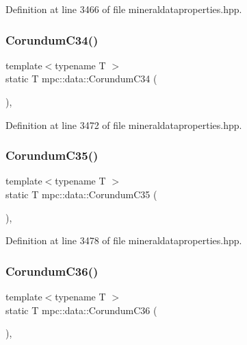 Definition at line 3466 of file mineraldataproperties.\+hpp.

\mbox{\label{namespacempc_1_1data_a0c5d889d0235384d47297eed4aefdea1}} 
\subsubsection{\texorpdfstring{Corundum\+C34()}{CorundumC34()}}
{\footnotesize\ttfamily template$<$typename T $>$ \\
static T mpc\+::data\+::\+Corundum\+C34 (\begin{DoxyParamCaption}{ }\end{DoxyParamCaption})\hspace{0.3cm}{\ttfamily [inline]}, {\ttfamily [static]}}



Definition at line 3472 of file mineraldataproperties.\+hpp.

\mbox{\label{namespacempc_1_1data_a65507f6191b27515bbcb02f456254042}} 
\subsubsection{\texorpdfstring{Corundum\+C35()}{CorundumC35()}}
{\footnotesize\ttfamily template$<$typename T $>$ \\
static T mpc\+::data\+::\+Corundum\+C35 (\begin{DoxyParamCaption}{ }\end{DoxyParamCaption})\hspace{0.3cm}{\ttfamily [inline]}, {\ttfamily [static]}}



Definition at line 3478 of file mineraldataproperties.\+hpp.

\mbox{\label{namespacempc_1_1data_aa692b36507972d312ded3a06dfd51d58}} 
\subsubsection{\texorpdfstring{Corundum\+C36()}{CorundumC36()}}
{\footnotesize\ttfamily template$<$typename T $>$ \\
static T mpc\+::data\+::\+Corundum\+C36 (\begin{DoxyParamCaption}{ }\end{DoxyParamCaption})\hspace{0.3cm}{\ttfamily [inline]}, {\ttfamily [static]}}



